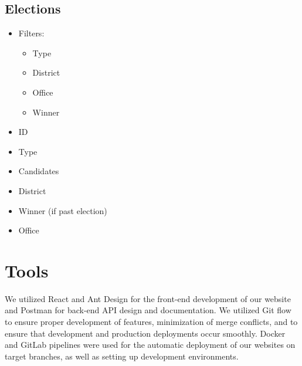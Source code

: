 \documentclass[11t]{article}
\begin{document}
\subsection{Elections}
\begin{itemize}
    \item Filters:
    \begin{itemize}
        \item Type
        \item District
        \item Office
        \item Winner
    \end{itemize}
    \item ID
    \item Type
    \item Candidates
    \item District
    \item Winner (if past election)
    \item Office
\end{itemize}

\section{Tools}

We utilized React and Ant Design for the front-end development of our website and Postman for back-end API design and documentation. We utilized Git flow to ensure proper development of features, minimization of merge conflicts, and to ensure that development and production deployments occur smoothly. Docker and GitLab pipelines were used for the automatic deployment of our websites on target branches, as well as setting up development environments.

 
\end{document}
